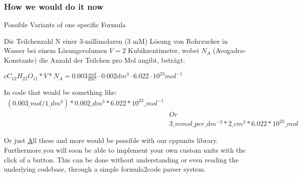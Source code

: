 \documentclass{beamer}
\begin{document}
\begin{frame}
\frametitle{How we would do it now}
    
 
\end{frame}


\begin{frame}{Possible Variants of one specific Formula}
    

Die Teilchenzahl N einer 3-millimolaren (3 mM) Lösung von Rohrzucker in Wasser bei einem Lösungsvolumen $V = 2$ Kubikzentimeter, wobei $N_{A}$ (Avogadro-Konstante) die Anzahl der Teilchen pro Mol angibt, beträgt:


$ c C_{12} H_{22} O_{11} * V * N_{A} =0.003\frac{mol}{dm^{3}} \cdot 0.002 dm^{3} \cdot 6.022 \cdot 10^{23}mol^{-1} $


In code that would be something like:
\[
\begin{array}{c}
(0.003\_mol / 1\_dm^{3}) * 0.002\_dm^{3} * 6.022 * 10^{23}\_mol^{-1}\\
&Or\\
&3\_mmol\_per\_dm^{-3} * 2\_cm^{3} * 6.022 * 10^{23}\_mol
\end{array}
\]


Or just 
\hyperlink{https://www.chemie.de/lexikon/images/math/a/8/5/a859b3abf3767634b37de76f7c9d7529.png}

 
All these and more would be possible with our cppunits library. 
Furthermore.you will soon be able to implement your own custom units with the click of  a button.
This can be done without understanding or even reading the underlying codebase, through a simple formula2code parser system.

\end{frame}
\end{document}
